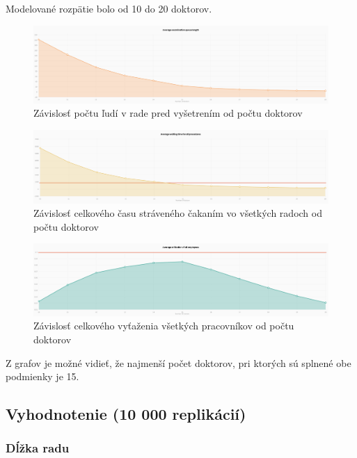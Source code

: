 \documentclass[letterpaper]{article}
\begin{document}
	Modelované rozpätie bolo od 10 do 20 doktorov.
	
	\begin{figure}[hbt!]
		\centering
		\includegraphics[width=\textwidth]{src/QuExa}
		\caption{Závislosť počtu ľudí v rade pred vyšetrením od počtu doktorov}
	\end{figure}

	\begin{figure}[hbt!]
		\centering
		\includegraphics[width=\textwidth]{src/Time}
		\caption{Závislosť celkového času stráveného čakaním vo všetkých radoch od počtu doktorov}
	\end{figure}

	\begin{figure}[hbt!]
		\centering
		\includegraphics[width=\textwidth]{src/Util}
		\caption{Závislosť celkového vyťaženia všetkých pracovníkov od počtu doktorov}
	\end{figure}
	
	Z grafov je možné vidieť, že najmenší počet doktorov, pri ktorých sú splnené obe podmienky je 15.
	
	\subsection*{Vyhodnotenie (10 000 replikácií)}
	
	\subsubsection*{Dĺžka radu}
	
\end{document}
